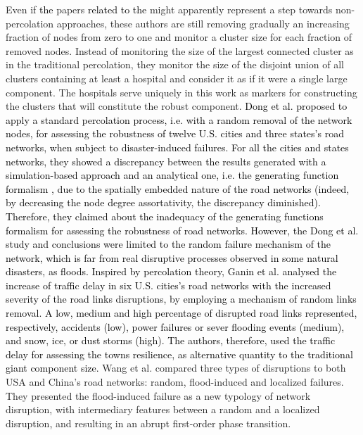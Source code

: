 \documentclass[twocolumn,fleqn,10pt]{wlscirep}
\begin{document}
Even if 
\textcolor{black}{the}
papers 
\textcolor{black}{related to the }
might apparently represent a step towards non-percolation approaches, these authors are still removing gradually an increasing fraction of nodes from zero to one and monitor a cluster size for each fraction of removed nodes. Instead of monitoring the size of the largest connected cluster as in the traditional percolation, they monitor the size of the disjoint union of all clusters containing at least a hospital and consider it as if it were a single large component. The hospitals serve uniquely in this work as markers for constructing the clusters that will constitute the robust component.
\textcolor{black}{
Dong et al. \cite{Dong2020b} proposed to apply a standard percolation process, i.e. with a random removal of the network nodes, for assessing the robustness of twelve U.S. cities and three states's road networks, when subject to disaster-induced failures. 
For all the cities and states networks, they showed a discrepancy between the results generated with a simulation-based approach and an analytical one, i.e. the generating function formalism \cite{Callaway2000, Newman2001}, due to the spatially embedded nature of the road networks (indeed, by decreasing the node degree assortativity, the discrepancy diminished). 
Therefore, they claimed about the inadequacy of the generating functions formalism for assessing the robustness of road networks. 
However, the Dong et al. \cite{Dong2020b} study and conclusions were limited to the random failure mechanism of the network, which is far from real disruptive processes observed in some natural disasters, as floods.}
\textcolor{black}{
Inspired by percolation theory, Ganin et al. \cite{Ganin} analysed the increase of traffic delay in six U.S. cities's road networks with the increased severity of the road links disruptions, by employing a mechanism of random links removal. A low, medium and high percentage of disrupted road links represented, respectively, accidents (low), power failures or sever flooding events (medium), and snow, ice, or dust storms (high). The authors, therefore, used the traffic delay for assessing the towns resilience, as alternative quantity to the traditional giant component size.}
Wang et al. \cite{Wang2019} compared three types of disruptions to both USA and China’s road networks: random, flood-induced and localized failures. They presented the flood-induced failure as a new typology of network disruption, with intermediary features between a random and a localized disruption\textcolor{black}{,} and resulting in an abrupt first-order phase transition. 
\end{document}
